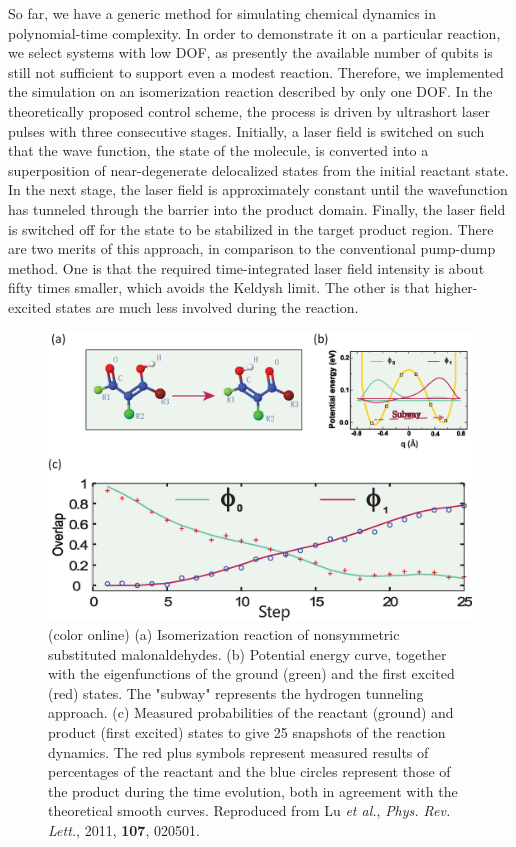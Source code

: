 \documentclass[8.5pt,twoside,twocolumn]{article}
\begin{document}
So far, we have a generic method for simulating chemical dynamics
in polynomial-time complexity. In order to demonstrate it on
a particular reaction, we select systems with low DOF,
as presently the available number of qubits
is still not sufficient to support even a modest reaction.
Therefore, we implemented the simulation on an isomerization reaction
described by only one DOF.\cite{Hydrogen-Subway}
In the theoretically proposed control scheme,\cite{Hydrogen-Subway}
the process is driven by ultrashort laser pulses
with three consecutive stages. Initially, a laser field is switched on
such that the wave function, the state of the molecule,
is converted into a superposition of near-degenerate delocalized
states from the initial reactant state.
In the next stage, the laser field is approximately constant
until the wavefunction has tunneled through the barrier
into the product domain. Finally, the laser field is switched off
for the state to be stabilized in the target product region.
There are two merits of this approach, in comparison to
the conventional pump-dump method. One is that
the required time-integrated laser field intensity is about
fifty times smaller, which avoids the Keldysh limit.\cite{Keldysh_limit}
The other is that higher-excited states are much less involved
during the reaction.

\begin{figure}[htb]
\begin{center}
\includegraphics[width= 0.95\columnwidth]{fig4.eps}
\end{center}
\caption{(color online) (a) Isomerization reaction of nonsymmetric substituted malonaldehydes.
(b) Potential energy curve, together with the eigenfunctions of
    the ground (green) and the first excited (red) states.
    The "subway" represents the hydrogen tunneling approach.
(c) Measured probabilities of the reactant (ground) and product (first excited) states
    to give 25 snapshots of the reaction dynamics.
    The red plus symbols represent measured results of
    percentages of the reactant and the blue circles
    represent those of the product
    during the time evolution, both in agreement with
    the theoretical smooth curves. Reproduced from Lu \emph{et al.}, \emph{Phys. Rev. Lett.}, 2011, \textbf{107}, 020501.\cite{NMR_dynamic}}\label{fig4}
\end{figure}
\end{document}
